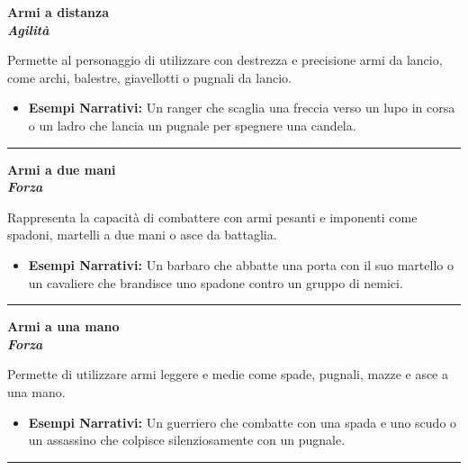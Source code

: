 \documentclass[../manuale_main.tex]{subfiles}
\begin{document}
\begin{center}
\textbf{\large{Armi a distanza}}\\ \textit{\textbf{Agilità}}\\
\end{center}
Permette al personaggio di utilizzare con destrezza e precisione armi da lancio, come archi, balestre, giavellotti o pugnali da lancio.

\begin{itemize}
\item \textbf{Esempi Narrativi:} Un ranger che scaglia una freccia verso un lupo in corsa o un ladro che lancia un pugnale per spegnere una candela.
\end{itemize}

\vspace{0.5cm}\rule{\textwidth}{0.4pt}\vspace{0.5cm}

\begin{center}
\textbf{\large{Armi a due mani}}\\ \textit{\textbf{Forza}}\\
\end{center}
Rappresenta la capacità di combattere con armi pesanti e imponenti come spadoni, martelli a due mani o asce da battaglia.

\begin{itemize}
\item \textbf{Esempi Narrativi:} Un barbaro che abbatte una porta con il suo martello o un cavaliere che brandisce uno spadone contro un gruppo di nemici.
\end{itemize}

\vspace{0.5cm}\rule{\textwidth}{0.4pt}\vspace{0.5cm}

\begin{center}
\textbf{\large{Armi a una mano}}\\ \textit{\textbf{Forza}}\\
\end{center}
Permette di utilizzare armi leggere e medie come spade, pugnali, mazze e asce a una mano.

\begin{itemize}
\item \textbf{Esempi Narrativi:} Un guerriero che combatte con una spada e uno scudo o un assassino che colpisce silenziosamente con un pugnale.
\end{itemize}

\vspace{0.5cm}\rule{\textwidth}{0.4pt}\vspace{0.5cm}
\end{document}

